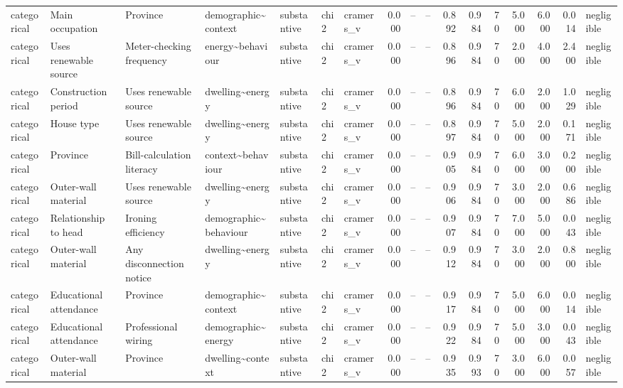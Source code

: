 \begin{table}
\begin{tabular}{lllllllrrrrrrrrrl}
categorical & Main occupation & Province & demographic\textasciitilde context & substantive & chi2 & cramers\_v & 0.000 & -- & -- & 0.892 & 0.984 & 70 & 5.000 & 6.000 & 0.014 & negligible \\
categorical & Uses renewable source & Meter-checking frequency & energy\textasciitilde behaviour & substantive & chi2 & cramers\_v & 0.000 & -- & -- & 0.896 & 0.984 & 70 & 2.000 & 4.000 & 2.400 & negligible \\
categorical & Construction period & Uses renewable source & dwelling\textasciitilde energy & substantive & chi2 & cramers\_v & 0.000 & -- & -- & 0.896 & 0.984 & 70 & 6.000 & 2.000 & 1.029 & negligible \\
categorical & House type & Uses renewable source & dwelling\textasciitilde energy & substantive & chi2 & cramers\_v & 0.000 & -- & -- & 0.897 & 0.984 & 70 & 5.000 & 2.000 & 0.171 & negligible \\
categorical & Province & Bill-calculation literacy & context\textasciitilde behaviour & substantive & chi2 & cramers\_v & 0.000 & -- & -- & 0.905 & 0.984 & 70 & 6.000 & 3.000 & 0.200 & negligible \\
categorical & Outer-wall material & Uses renewable source & dwelling\textasciitilde energy & substantive & chi2 & cramers\_v & 0.000 & -- & -- & 0.906 & 0.984 & 70 & 3.000 & 2.000 & 0.686 & negligible \\
categorical & Relationship to head & Ironing efficiency & demographic\textasciitilde behaviour & substantive & chi2 & cramers\_v & 0.000 & -- & -- & 0.907 & 0.984 & 70 & 7.000 & 5.000 & 0.043 & negligible \\
categorical & Outer-wall material & Any disconnection notice & dwelling\textasciitilde energy & substantive & chi2 & cramers\_v & 0.000 & -- & -- & 0.912 & 0.984 & 70 & 3.000 & 2.000 & 0.800 & negligible \\
categorical & Educational attendance & Province & demographic\textasciitilde context & substantive & chi2 & cramers\_v & 0.000 & -- & -- & 0.917 & 0.984 & 70 & 5.000 & 6.000 & 0.014 & negligible \\
categorical & Educational attendance & Professional wiring & demographic\textasciitilde energy & substantive & chi2 & cramers\_v & 0.000 & -- & -- & 0.922 & 0.984 & 70 & 5.000 & 3.000 & 0.043 & negligible \\
categorical & Outer-wall material & Province & dwelling\textasciitilde context & substantive & chi2 & cramers\_v & 0.000 & -- & -- & 0.935 & 0.993 & 70 & 3.000 & 6.000 & 0.057 & negligible \\

\end{tabular}
\end{table}
